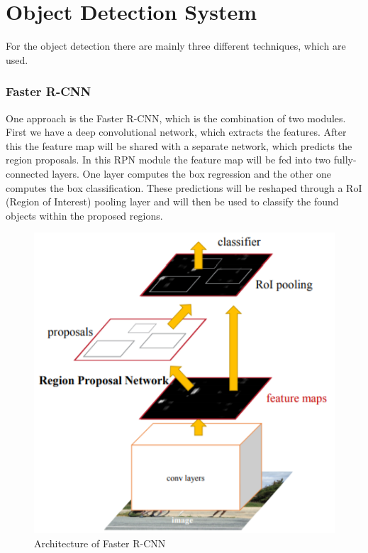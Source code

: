 \section{Object Detection System}

For the object detection there are mainly three different techniques, which are used.

\subsubsection{Faster R-CNN}

One approach is the Faster R-CNN, which is the combination of two modules. First we have a deep convolutional network, which extracts the features. After this the feature map will be shared with a separate network, which predicts the region proposals. In this RPN module the feature map will be fed into two fully-connected layers. One layer computes the box regression and the other one computes the box classification. These predictions will be reshaped through a RoI (Region of Interest) pooling layer and will then be used to classify the found objects within the proposed regions.

\begin{figure}[H]
\centering
\includegraphics{sources/Faster_R-CNN.png}
\caption[Architecture of Faster R-CNN]{Architecture of Faster R-CNN \cite{tim2}}
\label{fig:depthwise_convolution}
\end{figure}

